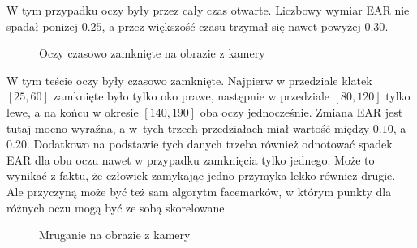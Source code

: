 W tym przypadku oczy były przez cały czas otwarte. Liczbowy wymiar EAR nie spadał poniżej $0.25$, a przez większość czasu trzymał się nawet powyżej $0.30$.

\begin{figure}[!h]
    \centering
    \caption{Oczy czasowo zamknięte na obrazie z kamery}
    \label{fig:ear_live_close}
\end{figure}

W tym teście oczy były czasowo zamknięte. Najpierw w przedziale klatek $[25, 60]$ zamknięte było tylko oko prawe, następnie w przedziale $[80,120]$ tylko lewe, a na końcu w okresie $[140,190]$ oba oczy jednocześnie. Zmiana EAR jest tutaj mocno wyraźna, a w~tych trzech przedziałach miał wartość między $0.10$, a $0.20$. Dodatkowo na podstawie tych danych trzeba również odnotować spadek EAR dla obu oczu nawet w przypadku zamknięcia tylko jednego. Może to wynikać z faktu, że człowiek zamykając jedno przymyka lekko również drugie. Ale przyczyną może być też sam algorytm facemarków, w którym punkty dla różnych oczu mogą być ze sobą skorelowane.

\begin{figure}[!h]
    \centering
    \caption{Mruganie na obrazie z kamery}
    \label{fig:ear_live_blink}
\end{figure}

